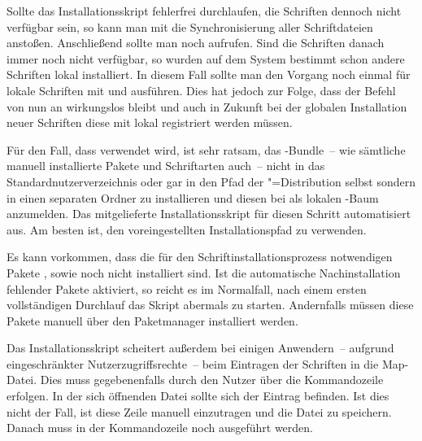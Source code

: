 Sollte das Installationsskript fehlerfrei durchlaufen, die Schriften dennoch 
nicht verfügbar sein, so kann man mit  
die Synchronisierung aller Schriftdateien anstoßen. Anschließend sollte man 
noch  aufrufen. Sind die Schriften danach immer noch 
nicht verfügbar, so wurden auf dem System bestimmt schon andere Schriften lokal 
installiert. In diesem Fall sollte man den Vorgang noch einmal für lokale 
Schriften mit  und  
ausführen. Dies hat jedoch zur Folge, dass der Befehl  von nun 
an wirkungslos bleibt und auch in Zukunft bei der globalen Installation neuer 
Schriften diese mit  lokal registriert werden müssen.

Für den Fall, dass  verwendet wird, ist sehr 
ratsam, das \TUDScript-Bundle~-- wie sämtliche manuell installierte Pakete und 
Schriftarten auch~-- nicht in das Standardnutzerverzeichnis oder gar in den
Pfad der "=Distribution selbst sondern in einen 
separaten Ordner zu installieren und diesen bei  
als lokalen -Baum anzumelden. Das mitgelieferte Installationsskript 
für diesen Schritt automatisiert aus. Am besten ist, den voreingestellten 
Installationspfad zu verwenden.

Es kann vorkommen, dass die für den Schriftinstallationsprozess notwendigen 
Pakete ,  sowie  noch nicht 
installiert sind. Ist die automatische Nachinstallation fehlender Pakete 
aktiviert, so reicht es im Normalfall, nach einem ersten vollständigen 
Durchlauf das Skript abermals zu starten. Andernfalls müssen diese Pakete 
manuell über den Paketmanager installiert werden.

Das Installationsskript scheitert außerdem bei einigen Anwendern~-- aufgrund 
eingeschränkter Nutzerzugriffsrechte~-- beim Eintragen der Schriften in die 
Map-Datei. Dies muss gegebenenfalls durch den Nutzer über die Kommandozeile 
 erfolgen. In der sich öffnenden 
Datei sollte sich der Eintrag  befinden. Ist dies nicht 
der Fall, ist diese Zeile manuell einzutragen und die Datei zu speichern. 
Danach muss in der Kommandozeile noch  ausgeführt 
werden.


